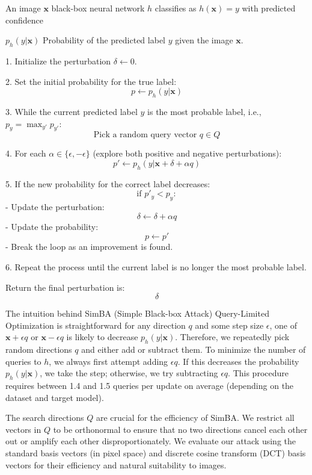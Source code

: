  An image $\mathbf{x}$ 
 black-box neural network $h$ classifies as $h(\mathbf{x}) = y$ with predicted confidence

$p_h(y | \mathbf{x})$ Probability of the predicted label $y$ given the image $\mathbf{x}$.



1. Initialize the perturbation $\delta \leftarrow 0$.

2. Set the initial probability for the true label: 
\[
p \leftarrow p_h(y | \mathbf{x})
\]

3. While the current predicted label $y$ is the most probable label, i.e., $p_y = \max_{y'} p_{y'}$:
\[
\text{Pick a random query vector } q \in Q
\]

4. For each $\alpha \in \{\epsilon, -\epsilon\}$ (explore both positive and negative perturbations):
\[
p' \leftarrow p_h(y | \mathbf{x} + \delta + \alpha q)
\]

5. If the new probability for the correct label decreases:
\[
\text{if } p'_y < p_y:
\]
    - Update the perturbation:
    \[
    \delta \leftarrow \delta + \alpha q
    \]
    - Update the probability:
    \[
    p \leftarrow p'
    \]
    - Break the loop as an improvement is found.

6. Repeat the process until the current label is no longer the most probable label.

Return the final perturbation is:
\[
\delta
\]


The intuition behind SimBA (Simple Black-box Attack) Query-Limited Optimization is straightforward for any direction $q$ and some step size $\epsilon$, one of $\mathbf{x} + \epsilon q$ or $\mathbf{x} - \epsilon q$ is likely to decrease $p_h(y | \mathbf{x})$. Therefore, we repeatedly pick random directions $q$ and either add or subtract them. To minimize the number of queries to $h$, we always first attempt adding $\epsilon q$. If this decreases the probability $p_h(y | \mathbf{x})$, we take the step; otherwise, we try subtracting $\epsilon q$. This procedure requires between 1.4 and 1.5 queries per update on average (depending on the dataset and target model).

The search directions $Q$ are crucial for the efficiency of SimBA. We restrict all vectors in $Q$ to be orthonormal to ensure that no two directions cancel each other out or amplify each other disproportionately. We evaluate our attack using the standard basis vectors (in pixel space) and discrete cosine transform (DCT) basis vectors for their efficiency and natural suitability to images.


